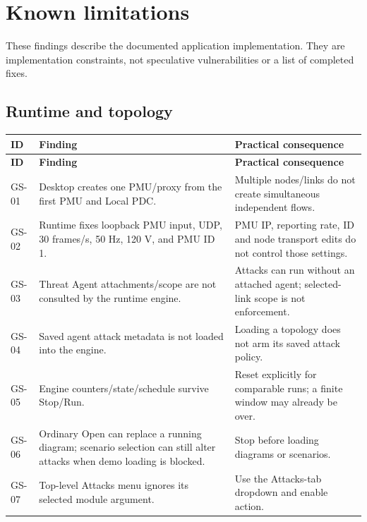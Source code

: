 \chapter{Known limitations}\label{chapter-16}
These findings describe the documented application implementation. They are implementation constraints, not speculative vulnerabilities or a list of completed fixes.

\section*{Runtime and topology}
\begingroup
\fontsize{8.7}{11.8}\selectfont
\setlength{\tabcolsep}{5pt}
\renewcommand{\arraystretch}{1.23}
\begin{longtable}{@{}>{\raggedright\arraybackslash}p{}>{\raggedright\arraybackslash}p{}>{\raggedright\arraybackslash}p{}@{}}
\rowcolor{navy} \color{white}\bfseries ID & \color{white}\bfseries Finding & \color{white}\bfseries Practical consequence \\
\endfirsthead
\rowcolor{navy} \color{white}\bfseries ID & \color{white}\bfseries Finding & \color{white}\bfseries Practical consequence \\
\endhead
\endfoot
\rowcolor{pale}
GS-01 & Desktop creates one PMU/proxy from the first PMU and Local PDC. & Multiple nodes/links do not create simultaneous independent flows. \\
GS-02 & Runtime fixes loopback PMU input, UDP, 30 frames/s, 50 Hz, 120 V, and PMU ID 1. & PMU IP, reporting rate, ID and node transport edits do not control those settings. \\
\rowcolor{pale}
GS-03 & Threat Agent attachments/scope are not consulted by the runtime engine. & Attacks can run without an attached agent; selected-link scope is not enforcement. \\
GS-04 & Saved agent attack metadata is not loaded into the engine. & Loading a topology does not arm its saved attack policy. \\
\rowcolor{pale}
GS-05 & Engine counters/state/schedule survive Stop/Run. & Reset explicitly for comparable runs; a finite window may already be over. \\
GS-06 & Ordinary Open can replace a running diagram; scenario selection can still alter attacks when demo loading is blocked. & Stop before loading diagrams or scenarios. \\
\rowcolor{pale}
GS-07 & Top-level Attacks menu ignores its selected module argument. & Use the Attacks-tab dropdown and enable action. \\
\end{longtable}
\endgroup

